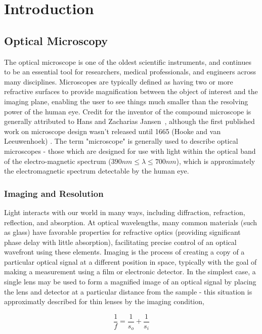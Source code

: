 \chapter{Introduction}\label{ch:introduction}

\section{Optical Microscopy}

The optical microscope is one of the oldest scientific instruments, and continues to be an essential tool for researchers, medical professionals, and engineers across many disciplines. Microscopes are typically defined as having two or more refractive surfaces to provide magnification between the object of interest and the imaging plane, enabling the user to see things much smaller than the resolving power of the human eye. Credit for the inventor of the compound microscope is generally attributed to Hans and Zacharias Jansen~\cite{van2010origins}, although the first published work on microscope design wasn't released until 1665 (Hooke and van Leeuwenhoek) \cite{natureMilestones,hookeMicrographica}. The term "microscope" is generally used to describe optical microscopes - those which are designed for use with light within the optical band of the electro-magnetic spectrum ($390nm \leq \lambda \leq 700nm$), which is approximately the electromagnetic spectrum detectable by the human eye.

\subsection{Imaging and Resolution}
Light interacts with our world in many ways, including diffraction, refraction, reflection, and absorption. At optical wavelengths, many common materials (such as glass) have favorable properties for refractive optics (providing significant phase delay with little absorption), facilitating precise control of an optical wavefront using these elements. Imaging is the process of creating a copy of a particular optical signal at a different position in space, typically with the goal of making a measurement using a film or electronic detector. In the simplest case, a single lens may be used to form a magnified image of an optical signal by placing the lens and detector at a particular distance from the sample - this situation is approximatly described for thin lenses by the imaging condition,

\begin{equation}
\frac{1}{f} = \frac{1}{s_o} + \frac{1}{s_i}
\end{equation}

